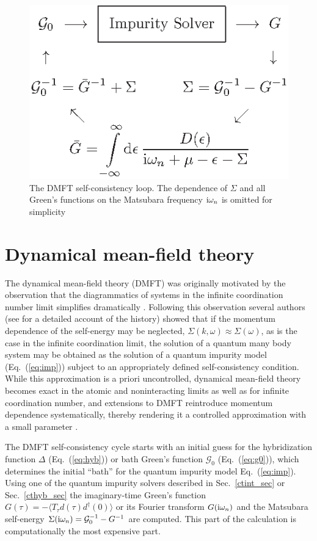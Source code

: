 \documentclass[3p,twocolumn]{elsarticle}
\begin{document}
\begin{figure}
\centering
\includegraphics{loop.eps}
\caption{The DMFT self-consistency loop. The dependence of $\Sigma$
  and all Green's functions on the Matsubara frequency ${\rm
    i}\omega_n$ is omitted for simplicity}
\label{fig:loop}
\end{figure}
\section{Dynamical mean-field theory}
\label{self_sec}
The dynamical mean-field theory (DMFT) \cite{Georges96,Pruschke95,Kotliar06} was
originally motivated by the observation that the diagrammatics of systems
in the infinite coordination number limit simplifies dramatically \cite{Metzner89,MH89}.
Following this observation several authors (see \cite{Georges96,Pruschke95} for a detailed account of the history) showed that if the momentum dependence of the self-energy
may be neglected, $\Sigma(k,\omega) \approx \Sigma(\omega)$, as is the case in the infinite coordination limit,
the solution of a quantum many body system may be obtained as the solution of a quantum impurity model (Eq.~(\ref{eq:imp})) subject to 
an appropriately defined self-consistency condition.
While this approximation is a priori uncontrolled, dynamical mean-field theory becomes exact in the atomic and noninteracting limits as well as for infinite coordination number,
and extensions to DMFT \cite{Maier05} reintroduce momentum dependence systematically, thereby rendering it a controlled approximation with a small parameter \cite{Kozik10}.

The DMFT self-consistency cycle starts with an initial guess for the hybridization function $\Delta$ (Eq.~(\ref{eq:hyb})) or bath Green's function $\mathcal{G}_0$ (Eq.~(\ref{eq:g0})),
which determines the initial ``bath'' for the quantum impurity model Eq.~(\ref{eq:imp}). Using one of the quantum impurity solvers described in Sec.~\ref{ctint_sec} or Sec.~\ref{cthyb_sec} the imaginary-time Green's function $G(\tau)=-\langle T_\tau d(\tau) d^\dagger(0)\rangle$ or its Fourier transform $G({\rm i}\omega_n)$ and the Matsubara self-energy $\Sigma({\rm i}\omega_n) = \mathcal{G}_0^{-1}-G^{-1}$ are computed. This part of the calculation is computationally the most expensive part.
\end{document}
